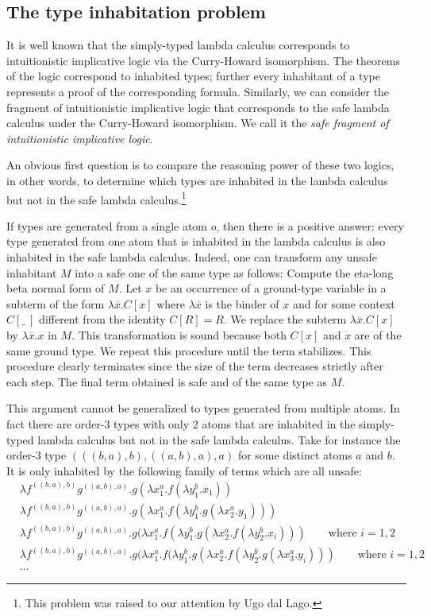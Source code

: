\subsection*{The type inhabitation problem}

It is well known that the simply-typed lambda calculus corresponds
to intuitionistic implicative logic via the Curry-Howard
isomorphism. The theorems of the logic correspond to inhabited
types; further every inhabitant of a type represents a proof of the
corresponding formula. Similarly, we can consider the fragment of
intuitionistic implicative logic that corresponds to the safe lambda
calculus under the Curry-Howard isomorphism. We call it the
\emph{safe fragment of intuitionistic implicative logic}.

An obvious first question is to compare the reasoning power of these
two logics, in other words, to determine which types are inhabited
in the lambda calculus but not in the safe lambda
calculus.\footnote{This problem was raised to our attention by Ugo
dal Lago.}

If types are generated from a single atom $o$, then there is a
positive answer: every type generated from one atom that is
inhabited in the lambda calculus is also inhabited in the safe
lambda calculus. Indeed, one can transform any unsafe inhabitant $M$
into a safe one of the same type as follows: Compute the eta-long
beta normal form of $M$. Let $x$ be an occurrence of a ground-type
variable in a subterm of the form $\lambda \overline{x} . C[x]$
where $\lambda \overline{x}$ is the binder of $x$ and for some
context $C[\_~]$ different from the identity $C[R]=R$. We replace
the subterm $\lambda \overline{x} . C[x]$ by $\lambda \overline{x}.
x$ in $M$. This transformation is sound because both $C[x]$ and $x$
are of the same ground type. We repeat this procedure until the term
stabilizes. This procedure clearly terminates since the size of the
term decreases strictly after each step. The final term obtained is
safe and of the same type as $M$.

This argument cannot be generalized to types generated from multiple
atoms. In fact there are order-$3$ types with only $2$ atoms that
are inhabited in the simply-typed lambda calculus but not in the
safe lambda calculus. Take for instance the order-$3$ type
 $( ((b, a), b),  ((a, b), a),  a)$ for some distinct atoms $a$ and $b$. It is only inhabited by the following family of terms which are all unsafe:
 \begin{align*}
& \lambda f^{((b, a), b)} g^{((a, b), a)} . g (\lambda x_1^a . f (\lambda y_1^b . x_1)) \\
&\lambda f^{((b, a), b)} g^{((a, b), a)} . g (\lambda x_1^a . f (\lambda y_1^b . g (\lambda x_2^a . y_1))) \\
&\lambda f^{((b, a), b)} g^{((a, b), a)} . g (\lambda x_1^a . f (\lambda y_1^b . g (\lambda x_2^a . f (\lambda y_2^b . x_i))) \qquad\mbox{where $i = 1, 2$} \\
&\lambda f^{((b, a), b)} g^{((a, b), a)} . g (\lambda x_1^a . f (\lambda y_1^b . g (\lambda x_2^a . f (\lambda y_2^b . g (\lambda x_3^a . y_i))) \qquad\mbox{where $i = 1, 2$} \\
&\ldots
\end{align*}

